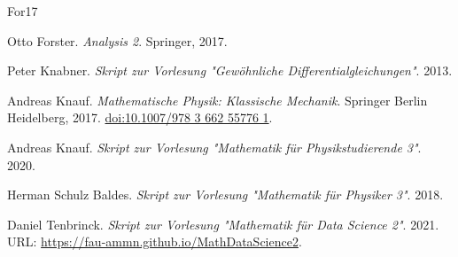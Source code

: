 \documentclass[letterpaper,10pt,english]{jupyterBook}
\begin{document}
\begin{sphinxthebibliography}{For17}
\par
Otto Forster. \emph{Analysis 2}. Springer, 2017.
\par
Peter Knabner. \emph{Skript zur Vorlesung "Gewöhnliche Differentialgleichungen"}. 2013.
\par
Andreas Knauf. \emph{Mathematische Physik: Klassische Mechanik}. Springer Berlin Heidelberg, 2017. \href{https://doi.org/10.1007/978-3-662-55776-1}{doi:10.1007/978 3 662 55776 1}.
\par
Andreas Knauf. \emph{Skript zur Vorlesung "Mathematik für Physikstudierende 3"}. 2020.
\par
Herman Schulz Baldes. \emph{Skript zur Vorlesung "Mathematik für Physiker 3"}. 2018.
\par
Daniel Tenbrinck. \emph{Skript zur Vorlesung "Mathematik für Data Science 2"}. 2021. URL: \url{https://fau-ammn.github.io/MathDataScience2}.
\end{sphinxthebibliography}






\renewcommand{\indexname}{Proof Index}


\renewcommand{\indexname}{Index}
\end{document}
